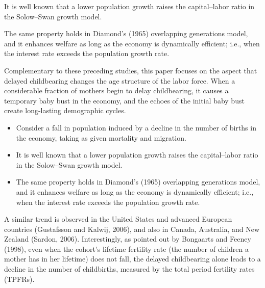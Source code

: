 \documentclass[nogrid]{MBE}%
\begin{document}
{\begin{arabiclist}
\item It is well known that a lower population growth raises the capital--labor ratio in the Solow--Swan
growth model.

\item The same property holds in Diamond's (1965) overlapping generations model, and it enhances welfare
as long as the economy is dynamically efficient; i.e., when the interest rate exceeds the
population growth rate.
\end{arabiclist}
Complementary to these preceding studies, this paper focuses on the aspect that delayed
childbearing changes the age structure of the labor force. When a considerable fraction of mothers
begin to delay childbearing, it causes a temporary baby bust in the economy, and the echoes of the
initial baby bust create long-lasting demographic cycles. %
\begin{itemize}
\item Consider a fall in population induced by a decline in the number of births in the economy,
taking as given mortality and migration.

\item It is well known that a lower population growth raises the capital--labor ratio in the Solow--Swan
growth model.

\item The same property holds in Diamond's (1965) overlapping generations model, and it enhances welfare
as long as the economy is dynamically efficient; i.e., when the interest rate exceeds the
population growth rate.
\end{itemize}
 A similar trend is observed in the United
States and advanced European countries (Gustafsson and Kalwij, 2006), and also in Canada,
Australia, and New Zealand (Sardon, 2006). Interestingly, as pointed out by Bongaarts and Feeney
(1998), even when the cohort's lifetime fertility rate (the number of children a mother has in her
lifetime) does not fall, the delayed childbearing alone leads to a decline in the number of
childbirths, measured by the total period fertility rates (TPFRs). %


}
\end{document}
